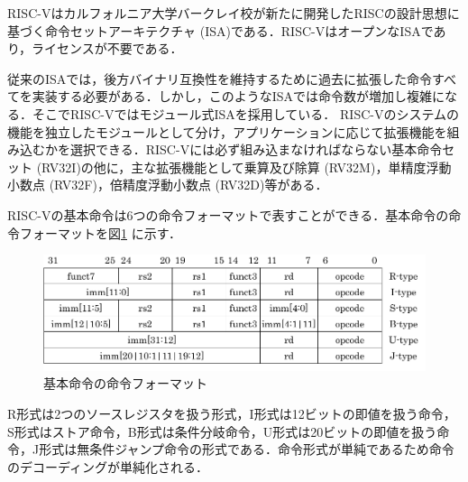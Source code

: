 
RISC-Vはカルフォルニア大学バークレイ校が新たに開発したRISCの設計思想に基づく命令セットアーキテクチャ (ISA)である．RISC-VはオープンなISAであり，ライセンスが不要である．

従来のISAでは，後方バイナリ互換性を維持するために過去に拡張した命令すべてを実装する必要がある．しかし，このようなISAでは命令数が増加し複雑になる．そこでRISC-Vではモジュール式ISAを採用している\cite{bib:risc-v-module}．
RISC-Vのシステムの機能を独立したモジュールとして分け，アプリケーションに応じて拡張機能を組み込むかを選択できる．RISC-Vには必ず組み込まなければならない基本命令セット (RV32I)の他に，主な拡張機能として乗算及び除算 (RV32M)，単精度浮動小数点 (RV32F)，倍精度浮動小数点 (RV32D)等がある．

RISC-Vの基本命令は6つの命令フォーマットで表すことができる．基本命令の命令フォーマットを図\ref{fig:RISC-V_Instruction_formats}
に示す．

\begin{figure}
    \centering
    \includegraphics[scale=0.8]{image/Inst_Format.pdf}
    \caption{基本命令の命令フォーマット}
    \label{fig:RISC-V_Instruction_formats}
\end{figure}

R形式は2つのソースレジスタを扱う形式，I形式は12ビットの即値を扱う命令，S形式はストア命令，B形式は条件分岐命令，U形式は20ビットの即値を扱う命令，J形式は無条件ジャンプ命令の形式である．命令形式が単純であるため命令のデコーディングが単純化される．